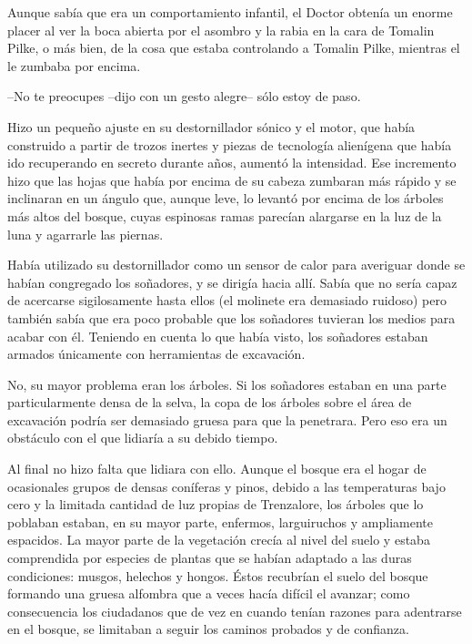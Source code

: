 \mbox{}


Aunque sabía que era un comportamiento infantil, el Doctor obtenía un enorme placer al ver la boca abierta por el asombro y la rabia en la cara de Tomalin Pilke, o más bien, de la cosa que estaba controlando a Tomalin Pilke, mientras el le zumbaba por encima.

--No te preocupes --dijo con un gesto alegre-- sólo estoy de paso.

Hizo un pequeño ajuste en su destornillador sónico y el motor, que había construido a partir de trozos inertes y piezas de tecnología alienígena que había ido recuperando en secreto durante años, aumentó la intensidad. Ese incremento hizo que las hojas que había por encima de su cabeza zumbaran más rápido y se inclinaran en un ángulo que, aunque leve, lo levantó por encima de los árboles más altos del bosque, cuyas espinosas ramas parecían alargarse en la luz de la luna y agarrarle las piernas.

Había utilizado su destornillador como un sensor de calor para averiguar donde se habían congregado los soñadores, y se dirigía hacia allí. Sabía que no sería capaz de acercarse sigilosamente hasta ellos (el molinete era demasiado ruidoso) pero también sabía que era poco probable que los soñadores tuvieran los medios para acabar con él. Teniendo en cuenta lo que había visto, los soñadores estaban armados únicamente con herramientas de excavación.

No, su mayor problema eran los árboles. Si los soñadores estaban en una parte particularmente densa de la selva, la copa de los árboles sobre el área de excavación podría ser demasiado gruesa para que la penetrara. Pero eso era un obstáculo con el que lidiaría a su debido tiempo.

Al final no hizo falta que lidiara con ello. Aunque el bosque era el hogar de ocasionales grupos de densas coníferas y pinos, debido a las temperaturas bajo cero y la limitada cantidad de luz propias de Trenzalore, los árboles que lo poblaban estaban, en su mayor parte, enfermos, larguiruchos y ampliamente espacidos. La mayor parte de la vegetación crecía al nivel del suelo y estaba comprendida por especies de plantas que se habían adaptado a las duras condiciones: musgos, helechos y hongos. Éstos recubrían el suelo del bosque formando una gruesa alfombra que a veces hacía difícil el avanzar; como consecuencia los ciudadanos que de vez en cuando tenían razones para adentrarse en el bosque, se limitaban a seguir los caminos probados y de confianza.

